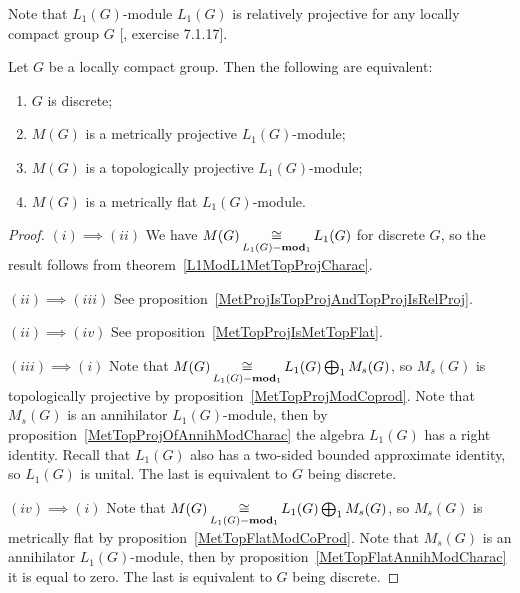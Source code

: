 Note that $L_1(G)$-module $L_1(G)$ is relatively projective for any locally
compact group $G$ [\cite{HelBanLocConvAlg}, exercise 7.1.17].

\begin{proposition}\label{L1MetTopProjAndMetrFlatOfMeasAlg} Let $G$ be 
a locally compact group. Then the following are equivalent:

\begin{enumerate}[label = (\roman*)]
    \item $G$ is discrete;

    \item $M(G)$ is a metrically projective $L_1(G)$-module;

    \item $M(G)$ is a topologically projective $L_1(G)$-module;

    \item $M(G)$ is a metrically flat $L_1(G)$-module.
\end{enumerate}
\end{proposition}
\begin{proof} 
$(i)\implies (ii)$ We have $M(G)\mathop{\mathbin{\cong}}\limits_{L_1(G)-\mathbf{mod}_1}L_1(G)$ for
discrete $G$, so the result follows from theorem~\ref{L1ModL1MetTopProjCharac}. 

$(ii)\implies (iii)$ See
proposition~\ref{MetProjIsTopProjAndTopProjIsRelProj}.

$(ii)\implies (iv)$ See proposition~\ref{MetTopProjIsMetTopFlat}.

$(iii)\implies (i)$ Note that $M(G)\mathop{\mathbin{\cong}}\limits_{L_1(G)-\mathbf{mod}_1}
L_1(G)\bigoplus_1 M_s(G)$, so $M_s(G)$ is topologically projective by
proposition~\ref{MetTopProjModCoprod}. Note that $M_s(G)$ is an annihilator
$L_1(G)$-module, then by proposition~\ref{MetTopProjOfAnnihModCharac} the
algebra $L_1(G)$ has a right identity. Recall that $L_1(G)$ also has a two-sided
bounded approximate identity, so $L_1(G)$ is unital. The last is equivalent to
$G$ being discrete.

$(iv)\implies (i)$ Note that $M(G)\mathop{\mathbin{\cong}}\limits_{L_1(G)-\mathbf{mod}_1}
L_1(G)\bigoplus_1 M_s(G)$, so $M_s(G)$ is metrically flat by
proposition~\ref{MetTopFlatModCoProd}. Note that $M_s(G)$ is an annihilator
$L_1(G)$-module, then by proposition~\ref{MetTopFlatAnnihModCharac} it is equal
to zero. The last is equivalent to $G$ being discrete.
\end{proof}

